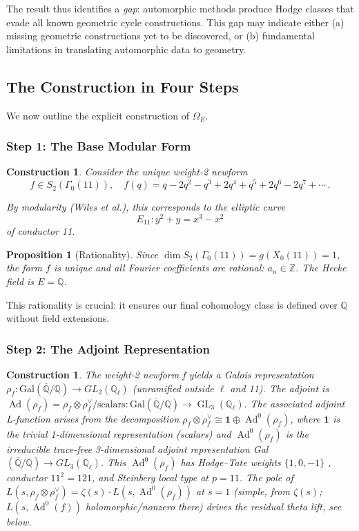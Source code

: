 \documentclass[12pt]{amsart}
\newtheorem{proposition}[theorem]{Proposition}
\newtheorem{construction}[theorem]{Construction}
\theoremstyle{definition}
\DeclareMathOperator\GL{GL}
\DeclareMathOperator\Ad{Ad}
\newcommand{\Q}{\mathbb{Q}}
\newcommand{\Z}{\mathbb{Z}}
\begin{document}
The result thus identifies a \textit{gap}: automorphic methods produce Hodge classes that evade all known geometric cycle constructions. This gap may indicate either (a) missing geometric constructions yet to be discovered, or (b) fundamental limitations in translating automorphic data to geometry.

\subsection{The Construction in Four Steps}

We now outline the explicit construction of $\Omega_E$.

\subsubsection{Step 1: The Base Modular Form}

\begin{construction}
Consider the unique weight-2 newform
$$f \in S_2(\Gamma_0(11)), \quad f(q) = q - 2q^2 - q^3 + 2q^4 + q^5+2q^6 - 2q^7 + \cdots \,.$$

By modularity (Wiles et al.), this corresponds to the elliptic curve
$$E_{11}: y^2 + y = x^3 - x^2$$
of conductor 11.
\end{construction}

\begin{proposition}[Rationality]
Since $\dim S_2(\Gamma_0(11)) = g(X_0(11)) = 1$, the form $f$ is unique and all Fourier coefficients are rational: $a_n \in \Z$. The Hecke field is $E = \Q$.
\end{proposition}

This rationality is crucial: it ensures our final cohomology class is defined over $\Q$ without field extensions.

\subsubsection{Step 2: The Adjoint Representation}

\begin{construction}
The weight-2 newform f yields a Galois representation $\rho_f : \mathrm{Gal}(\overline{\Q}/\Q) \rightarrow GL_2(\mathbb{Q}_\ell)$ (unramified outside $\ell$ and 11).  The adjoint is
$\Ad(\rho_f) = \rho_f \otimes \rho_f^\vee / \text{scalars}: \mathrm{Gal}(\overline{\Q}/\Q) \to \GL_3(\Q_\ell).$ The associated adjoint L-function arises from the decomposition $\rho_f \otimes \rho_f^\vee \cong \mathbf{1}  \oplus \Ad^0(\rho_f)$, where $\mathbf{1}$ is the trivial 1-dimensional representation (scalars) and $\Ad^0(\rho_f)$ is the irreducible trace-free 3-dimensional adjoint representation Gal$(\overline{\Q}/\Q) \rightarrow GL_3(\mathbb{Q}_\ell)$. This $\Ad^0(\rho_f)$ has Hodge–Tate weights $\{1, 0, -1\}$ , conductor $11^2 = 121$, and Steinberg local type at $p=11$. The pole of $L(s, \rho_f \otimes \rho_f^\vee) = \zeta(s) \cdot L(s, \Ad^0(\rho_f))$ at $s=1$ (simple, from $\zeta(s)$; $L(s, \Ad^0(f))$ holomorphic/nonzero there) drives the residual theta lift, see below.  \end{construction}
\end{document}
